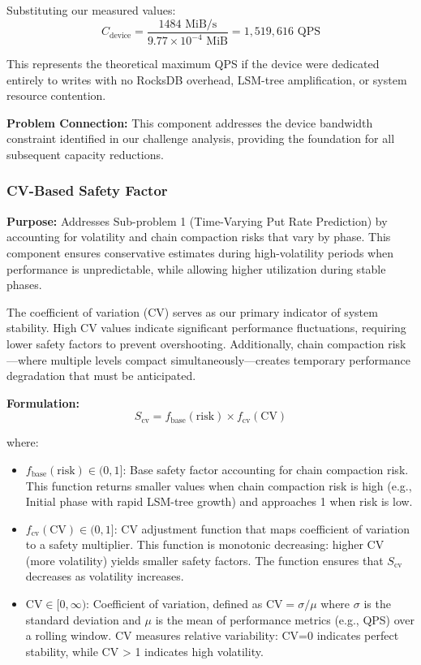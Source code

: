 \documentclass[11pt]{article}
\begin{document}
Substituting our measured values:
\[
C_{\text{device}} = \frac{1484 \text{ MiB/s}}{9.77 \times 10^{-4} \text{ MiB}} = 1,519,616 \text{ QPS}
\]

This represents the theoretical maximum QPS if the device were dedicated entirely to writes with no RocksDB overhead, LSM-tree amplification, or system resource contention.

\textbf{Problem Connection:} This component addresses the device bandwidth constraint identified in our challenge analysis, providing the foundation for all subsequent capacity reductions.

\subsubsection{CV-Based Safety Factor}
\textbf{Purpose:} Addresses Sub-problem 1 (Time-Varying Put Rate Prediction) by accounting for volatility and chain compaction risks that vary by phase. This component ensures conservative estimates during high-volatility periods when performance is unpredictable, while allowing higher utilization during stable phases.

The coefficient of variation (CV) serves as our primary indicator of system stability. High CV values indicate significant performance fluctuations, requiring lower safety factors to prevent overshooting. Additionally, chain compaction risk—where multiple levels compact simultaneously—creates temporary performance degradation that must be anticipated.

\textbf{Formulation:}
\begin{equation}
S_{\text{cv}} = f_{\text{base}}(\text{risk}) \times f_{\text{cv}}(\text{CV})
\label{eq:cv_safety}
\end{equation}

where:
\begin{itemize}
    \item $f_{\text{base}}(\text{risk}) \in (0, 1]$: Base safety factor accounting for chain compaction risk. This function returns smaller values when chain compaction risk is high (e.g., Initial phase with rapid LSM-tree growth) and approaches 1 when risk is low.
    
    \item $f_{\text{cv}}(\text{CV}) \in (0, 1]$: CV adjustment function that maps coefficient of variation to a safety multiplier. This function is monotonic decreasing: higher CV (more volatility) yields smaller safety factors. The function ensures that $S_{\text{cv}}$ decreases as volatility increases.
    
    \item $\text{CV} \in [0, \infty)$: Coefficient of variation, defined as $\text{CV} = \sigma / \mu$ where $\sigma$ is the standard deviation and $\mu$ is the mean of performance metrics (e.g., QPS) over a rolling window. CV measures relative variability: CV=0 indicates perfect stability, while CV > 1 indicates high volatility.
\end{itemize}
\end{document}
